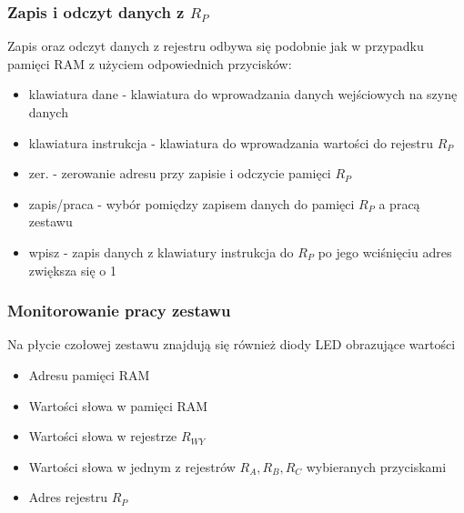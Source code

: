 \documentclass[../main.tex]{subfiles}
\begin{document}
    \subsubsection*{Zapis i odczyt danych z $R_P$}
    Zapis oraz odczyt danych z rejestru odbywa się podobnie jak w przypadku pamięci RAM z użyciem odpowiednich przycisków:
    \begin{itemize}
        \item klawiatura dane - klawiatura do wprowadzania danych wejściowych na szynę danych
        \item klawiatura instrukcja - klawiatura do wprowadzania wartości do rejestru $R_P$
        \item zer. - zerowanie adresu przy zapisie i odczycie pamięci $R_P$
        \item zapis/praca - wybór pomiędzy zapisem danych do pamięci $R_P$ a pracą zestawu
        \item wpisz - zapis danych z klawiatury instrukcja do $R_P$ po jego wciśnięciu adres zwiększa się o 1
    \end{itemize}

    \subsubsection*{Monitorowanie pracy zestawu}
    Na płycie czołowej zestawu znajdują się również diody LED obrazujące wartości 

    \begin{itemize}
        \item Adresu pamięci RAM
        \item Wartości słowa w pamięci RAM
        \item Wartości słowa w rejestrze $R_{WY}$
        \item Wartości słowa w jednym z rejestrów $R_A, R_B, R_C$ wybieranych przyciskami
        \item Adres rejestru $R_P$
    \end{itemize}
\end{document}
